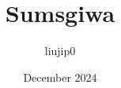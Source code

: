 \documentclass[12pt, letterpaper]{article}
\title{Sumsgiwa}
\author{liujip0}
\date{December 2024}
\begin{document}
\maketitle
\tableofcontents
\clearpage










\clearpage
\printglossary
\printacronyms
\printglosses
\end{document}
